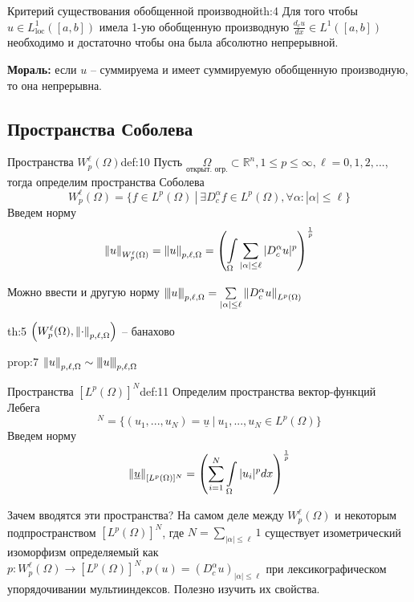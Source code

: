 \documentclass[12pt,a4paper]{article}
\newcommand{\intset}[1]{\int\limits_{#1}}
\newcommand{\Real}{\mathbb{R}}
\newcommand{\nnorm}[1]{{\left\vert\kern-0.25ex\left\vert\kern-0.25ex\left\vert #1 
		\right\vert\kern-0.25ex\right\vert\kern-0.25ex\right\vert}}
\begin{document}
\begin{theorem}{Критерий существования обобщенной производной}{th:4}
	Для того чтобы $u \in L_{\text{loc}}^1 ([a, b])$ имела 1-ую обобщенную производную $\frac{d_c u}{dx} \in L^1 ([a, b])$ необходимо и достаточно чтобы она была абсолютно непрерывной.
\end{theorem}
\textbf{Мораль:} если $u$ -- суммируема и имеет суммируемую обобщенную производную, то она непрерывна.

\subsection{Пространства Соболева}

\begin{definition}{Пространства $W_p^\ell (\Omega)$}{def:10}
	Пусть $\underset{\text{открыт. огр.}}{\Omega} \subset \Real^n, 1 \leq p \leq \infty, \ell = 0, 1, 2, ...$, тогда определим пространства Соболева
	\begin{equation*}
	 	W_p^\ell (\Omega) = \{f \in L^p (\Omega) \ | \ \exists D_c^\alpha f \in L^p (\Omega), \forall \alpha: |\alpha| \leq \ell\}
	\end{equation*}
	Введем норму
	\begin{equation*}
		\norm{u}_{W_p^\ell (\Omega)} = \norm{u}_{p, \ell, \Omega} = \left( \intset{\Omega}{\sum\limits_{|\alpha| \leq \ell}{|D_c^\alpha u|^p}} \right)^{\frac{1}{p}}
	\end{equation*}
\end{definition}
Можно ввести и другую норму $\nnorm{u}_{p, \ell, \Omega} = \sum\limits_{|\alpha| \leq \ell}{\norm{D_c^\alpha u}_{L^p (\Omega)}}$

\begin{theorem}{}{th:5}
	$\left(W_p^\ell (\Omega), \norm{\cdot}_{p, \ell, \Omega}\right)$ -- банахово
\end{theorem}

\begin{proposition}{}{prop:7}
	$\norm{u}_{p, \ell, \Omega} \sim \nnorm{u}_{p, \ell, \Omega}$
\end{proposition}

\begin{definition}{Пространства $[L^p (\Omega)]^N$}{def:11}
	Определим пространства вектор-функций Лебега
	\begin{equation*}
		[L^p (\Omega)]^N = \{(u_1, ..., u_N) = \underline{u} \ | \ u_1, ..., u_N \in L^p (\Omega)\} 
	\end{equation*}
	Введем норму
	\begin{equation*}
		\norm{\underline{u}}_{[L^p (\Omega)]^N} = \left(\sum\limits_{i=1}^{N}{\intset{\Omega}{|u_i|^p dx}}\right)^{\frac{1}{p}}
	\end{equation*}
\end{definition}
Зачем вводятся эти пространства? На самом деле между $W_p^\ell (\Omega)$ и некоторым подпространством $[L^p (\Omega)]^N$, где $N = \sum\limits_{|\alpha| \leq \ell}{1}$ существует изометрический изоморфизм определяемый как $p: W_p^\ell (\Omega) \to [L^p (\Omega)]^N, p(u) = (D_c^\alpha u)_{|\alpha| \leq \ell}$ при лексикографическом упорядочивании мультииндексов. Полезно изучить их свойства.
\end{document}
